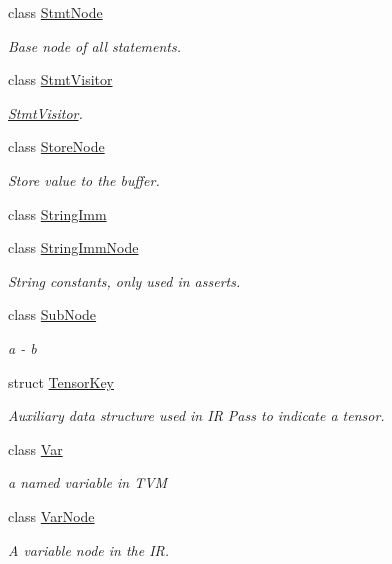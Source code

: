 \begin{DoxyCompactItemize}
class \hyperlink{classtvm_1_1tir_1_1StmtNode}{Stmt\+Node}
\begin{DoxyCompactList}\small\item\em Base node of all statements. \end{DoxyCompactList}\item 
class \hyperlink{classtvm_1_1tir_1_1StmtVisitor}{Stmt\+Visitor}
\begin{DoxyCompactList}\small\item\em \hyperlink{classtvm_1_1tir_1_1StmtVisitor}{Stmt\+Visitor}. \end{DoxyCompactList}\item 
class \hyperlink{classtvm_1_1tir_1_1StoreNode}{Store\+Node}
\begin{DoxyCompactList}\small\item\em Store value to the buffer. \end{DoxyCompactList}\item 
class \hyperlink{classtvm_1_1tir_1_1StringImm}{String\+Imm}
\item 
class \hyperlink{classtvm_1_1tir_1_1StringImmNode}{String\+Imm\+Node}
\begin{DoxyCompactList}\small\item\em String constants, only used in asserts. \end{DoxyCompactList}\item 
class \hyperlink{classtvm_1_1tir_1_1SubNode}{Sub\+Node}
\begin{DoxyCompactList}\small\item\em a -\/ b \end{DoxyCompactList}\item 
struct \hyperlink{structtvm_1_1tir_1_1TensorKey}{Tensor\+Key}
\begin{DoxyCompactList}\small\item\em Auxiliary data structure used in IR Pass to indicate a tensor. \end{DoxyCompactList}\item 
class \hyperlink{classtvm_1_1tir_1_1Var}{Var}
\begin{DoxyCompactList}\small\item\em a named variable in T\+VM \end{DoxyCompactList}\item 
class \hyperlink{classtvm_1_1tir_1_1VarNode}{Var\+Node}
\begin{DoxyCompactList}\small\item\em A variable node in the IR. \end{DoxyCompactList}\end{DoxyCompactItemize}
